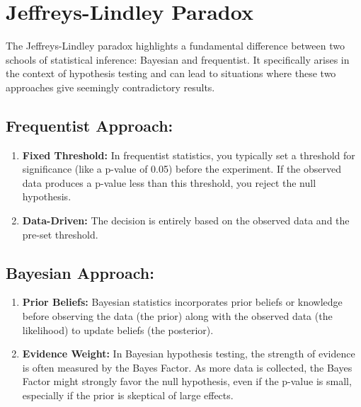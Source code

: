 \documentclass{article}
\begin{document}
\section*{Jeffreys-Lindley Paradox}

The Jeffreys-Lindley paradox highlights a fundamental difference between two schools of statistical inference: Bayesian and frequentist. It specifically arises in the context of hypothesis testing and can lead to situations where these two approaches give seemingly contradictory results.

\subsection*{Frequentist Approach:}
\begin{enumerate}
    \item \textbf{Fixed Threshold:} In frequentist statistics, you typically set a threshold for significance (like a p-value of 0.05) before the experiment. If the observed data produces a p-value less than this threshold, you reject the null hypothesis.
    \item \textbf{Data-Driven:} The decision is entirely based on the observed data and the pre-set threshold.
\end{enumerate}

\subsection*{Bayesian Approach:}
\begin{enumerate}
    \item \textbf{Prior Beliefs:} Bayesian statistics incorporates prior beliefs or knowledge before observing the data (the prior) along with the observed data (the likelihood) to update beliefs (the posterior).
    \item \textbf{Evidence Weight:} In Bayesian hypothesis testing, the strength of evidence is often measured by the Bayes Factor. As more data is collected, the Bayes Factor might strongly favor the null hypothesis, even if the p-value is small, especially if the prior is skeptical of large effects.
\end{enumerate}
\end{document}
